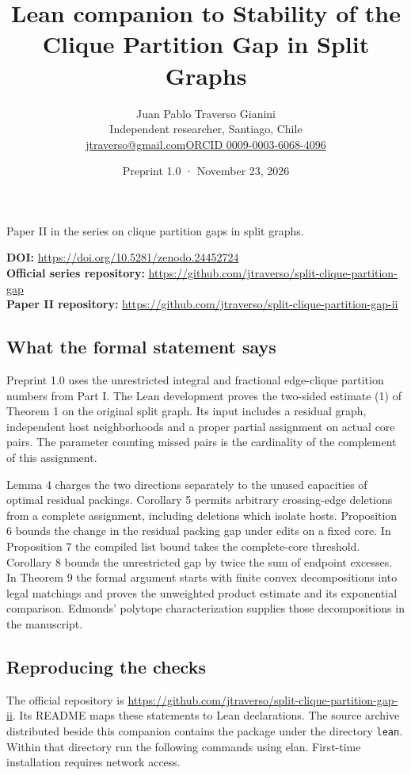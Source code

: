 \documentclass[english,10pt,a4paper]{article}
\title{Lean companion to Stability of the Clique Partition Gap in Split Graphs}
\author{Juan Pablo Traverso Gianini\\\small Independent researcher, Santiago, Chile\\\small\href{mailto:jtraverso@gmail.com}{jtraverso@gmail.com}\quad\href{https://orcid.org/0009-0003-6068-4096}{ORCID 0009-0003-6068-4096}}
\date{Preprint 1.0 \enspace · \enspace November 23, 2026}
\begin{document}
\raggedbottom\maketitle\vspace{-1.5em}
\begin{center}\small Paper II in the series on clique partition gaps in split graphs.\end{center}
\noindent\textbf{DOI:} \url{https://doi.org/10.5281/zenodo.24452724}\\
\textbf{Official series repository:} \url{https://github.com/jtraverso/split-clique-partition-gap}\\
\textbf{Paper II repository:} \url{https://github.com/jtraverso/split-clique-partition-gap-ii}
\subsection{What the formal statement says}\label{what-the-formal-statement-says}

Preprint 1.0 uses the unrestricted integral and fractional edge-clique partition numbers from Part I. The Lean development proves the two-sided estimate (1) of Theorem 1 on the original split graph. Its input includes a residual graph, independent host neighborhoods and a proper partial assignment on actual core pairs. The parameter counting missed pairs is the cardinality of the complement of this assignment.

Lemma 4 charges the two directions separately to the unused capacities of optimal residual packings. Corollary 5 permits arbitrary crossing-edge deletions from a complete assignment, including deletions which isolate hosts. Proposition 6 bounds the change in the residual packing gap under edits on a fixed core. In Proposition 7 the compiled list bound takes the complete-core threshold. Corollary 8 bounds the unrestricted gap by twice the sum of endpoint excesses. In Theorem 9 the formal argument starts with finite convex decompositions into legal matchings and proves the unweighted product estimate and its exponential comparison. Edmonds' polytope characterization supplies those decompositions in the manuscript.

\subsection{Reproducing the checks}\label{reproducing-the-checks}

The official repository is \url{https://github.com/jtraverso/split-clique-partition-gap-ii}. Its README maps these statements to Lean declarations. The source archive distributed beside this companion contains the package under the directory \texttt{lean}. Within that directory run the following commands using elan. First-time installation requires network access.
\end{document}
